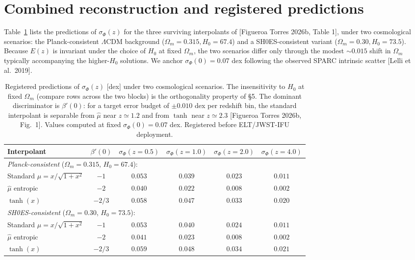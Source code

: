\documentclass[11pt,a4paper]{article}
\begin{document}
\section{Combined reconstruction and registered predictions}

Table~\ref{tab:pred} lists the predictions of $\sigma_\Phi(z)$ for the three
surviving interpolants of [Figueroa Torres 2026b, Table 1], under two
cosmological scenarios: the Planck-consistent $\Lambda$CDM background
($\Omega_m = 0.315, H_0 = 67.4$) and a SH0ES-consistent variant
($\Omega_m = 0.30, H_0 = 73.5$). Because $E(z)$ is invariant under the
choice of $H_0$ at fixed $\Omega_m$, the two scenarios differ only through
the modest $\sim 0.015$ shift in $\Omega_m$ typically accompanying the
higher-$H_0$ solutions. We anchor $\sigma_\Phi(0) = 0.07$ dex following the
observed SPARC intrinsic scatter [Lelli et al.\ 2019].

\begin{table}[h]
\centering
\begin{tabular}{l c c c c c}
\toprule
Interpolant & $\beta'(0)$ &
$\sigma_\Phi(z{=}0.5)$ &
$\sigma_\Phi(z{=}1.0)$ &
$\sigma_\Phi(z{=}2.0)$ &
$\sigma_\Phi(z{=}4.0)$ \\
\midrule
\multicolumn{6}{l}{\emph{Planck-consistent} ($\Omega_m = 0.315$, $H_0 = 67.4$):} \\
Standard $\mu = x/\sqrt{1+x^2}$
  & $-1$    & $0.053$ & $0.039$ & $0.023$ & $0.011$ \\
$\hat\mu$ entropic
  & $-2$    & $0.040$ & $0.022$ & $0.008$ & $0.002$ \\
$\tanh(x)$
  & $-2/3$  & $0.058$ & $0.047$ & $0.033$ & $0.020$ \\
\midrule
\multicolumn{6}{l}{\emph{SH0ES-consistent} ($\Omega_m = 0.30$, $H_0 = 73.5$):} \\
Standard $\mu = x/\sqrt{1+x^2}$
  & $-1$    & $0.053$ & $0.040$ & $0.024$ & $0.011$ \\
$\hat\mu$ entropic
  & $-2$    & $0.041$ & $0.023$ & $0.008$ & $0.002$ \\
$\tanh(x)$
  & $-2/3$  & $0.059$ & $0.048$ & $0.034$ & $0.021$ \\
\bottomrule
\end{tabular}
\caption{Registered predictions of $\sigma_\Phi(z)$ [dex] under two
cosmological scenarios. The insensitivity to $H_0$ at fixed $\Omega_m$
(compare rows across the two blocks) is the orthogonality property of \S5.
The dominant discriminator is $\beta'(0)$: for a target error budget of
$\pm 0.010$ dex per redshift bin, the standard interpolant is separable from
$\hat\mu$ near $z \simeq 1.2$ and from $\tanh$ near $z \simeq 2.3$ [Figueroa
Torres 2026b, Fig.~1]. Values computed at fixed $\sigma_\Phi(0) = 0.07$ dex.
Registered before ELT/JWST-IFU deployment.}
\label{tab:pred}
\end{table}
\end{document}
